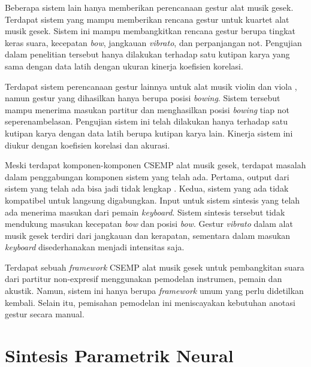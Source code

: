 Beberapa sistem lain hanya memberikan perencanaan gestur alat musik gesek. Terdapat sistem yang mampu memberikan rencana gestur untuk kuartet alat musik gesek. \parencite{marchini2014quartet} Sistem ini mampu membangkitkan rencana gestur berupa tingkat keras suara, kecepatan \textit{bow}, jangkauan \textit{vibrato}, dan perpanjangan not. Pengujian dalam penelitian tersebut hanya dilakukan terhadap satu kutipan karya yang sama dengan data latih dengan ukuran kinerja koefisien korelasi.

Terdapat sistem perencanaan gestur lainnya untuk alat musik violin dan viola \parencite{yu2017bowing}, namun gestur yang dihasilkan hanya berupa posisi \textit{bowing}. Sistem tersebut mampu menerima masukan partitur dan menghasilkan posisi \textit{bowing} tiap not seperenambelasan. Pengujian sistem ini telah dilakukan hanya terhadap satu kutipan karya dengan data latih berupa kutipan karya lain. Kinerja sistem ini diukur dengan koefisien korelasi dan akurasi.

Meski terdapat komponen-komponen CSEMP alat musik gesek, terdapat masalah dalam penggabungan komponen sistem yang telah ada. Pertama, output dari sistem yang telah ada bisa jadi tidak lengkap \parencite{yu2017bowing}. Kedua, sistem yang ada tidak kompatibel untuk langsung digabungkan. Input untuk sistem sintesis yang telah ada \parencite{lindemann2007rpm} menerima masukan dari pemain \textit{keyboard}. Sistem sintesis tersebut tidak mendukung masukan kecepatan \textit{bow} \parencite{marchini2014quartet}\parencite{yu2017bowing} dan posisi \textit{bow}\parencite{yu2017bowing}. Gestur \textit{vibrato} dalam alat musik gesek terdiri dari jangkauan dan kerapatan, sementara dalam masukan \textit{keyboard} disederhanakan menjadi intensitas saja.

Terdapat sebuah \textit{framework} CSEMP alat musik gesek untuk pembangkitan suara dari partitur non-expresif \parencite{perez2015} menggunakan pemodelan instrumen, pemain dan akustik. Namun, sistem ini hanya berupa \textit{framework} umum yang perlu didetilkan kembali. Selain itu, pemisahan pemodelan ini meniscayakan kebutuhan anotasi gestur secara manual.

\section{Sintesis Parametrik Neural} \label{literature-neural-parametric}

